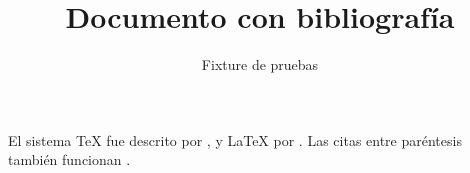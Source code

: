\documentclass[11pt,a4paper]{article}
\title{Documento con bibliografía}
\author{Fixture de pruebas}
\date{}
\begin{document}
\maketitle

El sistema \TeX{} fue descrito por \textcite{knuth1984}, y \LaTeX{} por
\textcite{lamport1994}. Las citas entre paréntesis también funcionan
\parencite{goossens2004,knuth1984}.

\printbibliography
\end{document}

